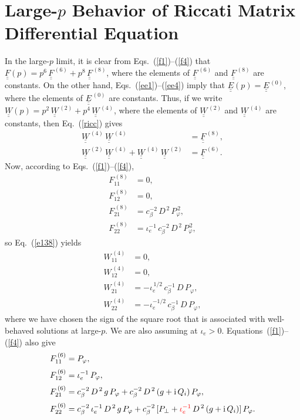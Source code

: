 \documentclass[12pt,prb,aps,notitlepage]{revtex4-1}
\begin{document}
\section{Large-$p$ Behavior of Riccati Matrix Differential Equation}
In the large-$p$ limit, it is clear from Eqs.~(\ref{f1})--(\ref{f4}) that  $\underline{\underline{F}}(p)=p^6\,\underline{\underline{F}}^{\,(6)}+ p^8\,\underline{\underline{F}}^{\,(8)}$, where the elements of $\underline{\underline{F}}^{\,(6)}$ and $\underline{\underline{F}}^{\,(8)}$ are constants.
On the other hand, Eqs.~(\ref{ee1})--(\ref{ee4}) imply that $\underline{\underline{E}}(p)=\underline{\underline{E}}^{\,(0)}$, 
where the elements of $\underline{\underline{E}}^{\,(0)}$ are constants. 
Thus, if we write $\underline{\underline{W}}(p) = p^2\,\underline{\underline{W}}^{\,(2)}+p^4\,\underline{\underline{W}}^{\,(4)}$,
where the elements of $\underline{\underline{W}}^{\,(2)}$ and  $\underline{\underline{W}}^{\,(4)}$ are constants, then Eq.~(\ref{ricc}) gives 
\begin{align}\label{e138}
\underline{\underline{W}}^{\,(4)}\,\underline{\underline{W}}^{\,(4)}&= \underline{\underline{F}}^{\,(8)},\\[0.5ex]
\underline{\underline{W}}^{\,(2)}\,\underline{\underline{W}}^{\,(4)}+ \underline{\underline{W}}^{\,(4)}\,\underline{\underline{W}}^{\,(2)}&= 
\underline{\underline{F}}^{\,(6)}.\label{e139}
\end{align}
Now, according to Eqs.~(\ref{f1})--(\ref{f4}), 
\begin{align}
F^{\,(8)}_{11} &=0,\\[0.5ex]
F^{\,(8)}_{12} &= 0,\\[0.5ex]
F^{\,(8)}_{21} &= c_\beta^{-2}\,D^{\,2}\,P_\varphi^{\,2},\\[0.5ex]
F^{\,(8)}_{22} &=\iota_e^{-1}\, c_\beta^{-2}\,D^{\,2}\,P_\varphi^{\,2},
\end{align}
so Eq.~(\ref{e138}) yields 
\begin{align}
W^{\,(4)}_{11} &=0,\\[0.5ex]
W^{\,(4)}_{12} &= 0,\\[0.5ex]
W^{\,(4)}_{21} &= -\iota_e^{\,1/2}\,c_\beta^{-1}\,D\,P_\varphi,\\[0.5ex]
W^{\,(4)}_{22} &=-\iota_e^{-1/2}\, c_\beta^{-1}\,D\,P_\varphi,
\end{align}
where we have chosen the sign of the square root that is associated with well-behaved solutions at large-$p$. We are also assuming at $\iota_e>0$. 
Equations~(\ref{f1})--(\ref{f4}) also give 
\begin{align}
F^{\,(6)}_{11} &=P_\varphi,\\[0.5ex]
F^{\,(6)}_{12} &= \iota_e^{-1}\,P_\varphi,\\[0.5ex]
F^{\,(6)}_{21} &=c_\beta^{-2}\,D^{\,2}\,g\,P_\varphi + c_\beta^{-2}\,D^{\,2}\,(g+{\rm i}\,Q_i)\,P_\varphi,\\[0.5ex]
F^{\,(6)}_{22} &=c_\beta^{-2}\,\iota_e^{-1}\,D^{\,2}\,g\,P_\varphi + c_\beta^{-2}\,[P_\perp+\textcolor{red}{\iota_e^{-1}}\,D^{\,2}\,(g+{\rm i}\,Q_i)]\,P_\varphi.
\end{align}
\end{document}
